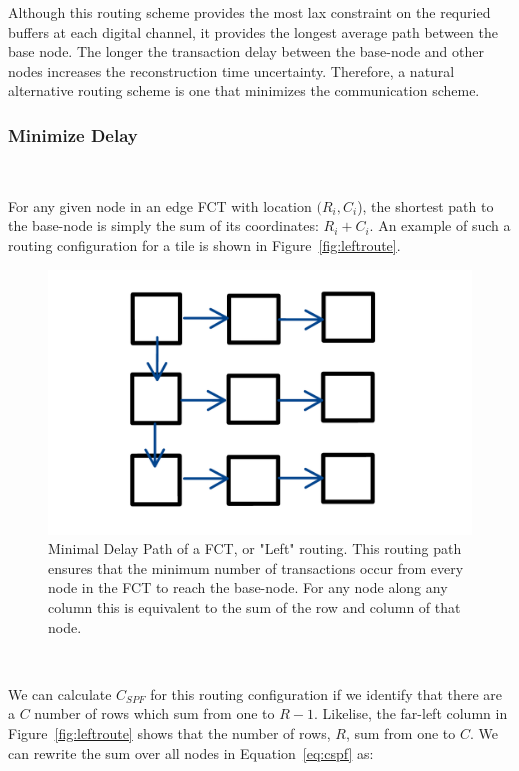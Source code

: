 Although this routing scheme provides the most lax constraint on the requried buffers at each digital channel, it provides the longest average path between the base node.
The longer the transaction delay between the base-node and other nodes increases the reconstruction time uncertainty.
Therefore, a natural alternative routing scheme is one that minimizes the communication scheme.

\subsubsection{Minimize Delay}~\label{sec:min_comm}

For any given node in an edge FCT with location $(R_{i},C_{i}$), the shortest path to the base-node is simply the sum of its coordinates: $R_{i}+C_{i}$.
An example of such a routing configuration for a tile is shown in Figure~\ref{fig:leftroute}.

\begin{figure}[]
\centering
\includegraphics[width=\textwidth]{images/leftroute.pdf}
\caption{Minimal Delay Path of a FCT, or "Left" routing.
This routing path ensures that the minimum number of transactions occur from every node in the FCT to reach the base-node.
For any node along any column this is equivalent to the sum of the row and column of that node.}
\end{figure}~\label{fig:leftroute}

We can calculate $C_{SPF}$ for this routing configuration if we identify that there are a $C$ number of rows which sum from one to $R-1$.
Likelise, the far-left column in Figure~\ref{fig:leftroute} shows that the number of rows, $R$, sum from one to $C$.
We can rewrite the sum over all nodes in Equation~\ref{eq:cspf} as:


